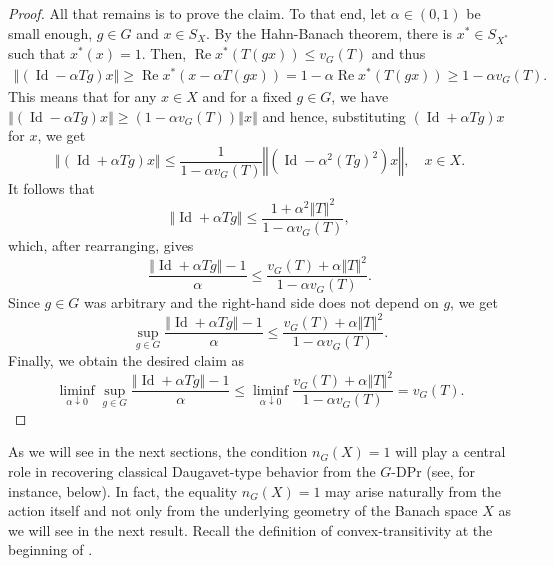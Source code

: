 \documentclass[a4paper,12pt]{amsart}
\theoremstyle{definition}
\theoremstyle{definition}
\theoremstyle{remark}
\numberwithin{equation}{section}
\DeclareMathOperator{\re}{Re}
\DeclareMathOperator{\id}{Id}
\newcommand{\<}{\langle}
\renewcommand{\>}{\rangle}
\newcommand{\norm}[1]{\left\Vert#1\right\Vert}
\begin{document}
\begin{proof}
		All that remains is to prove the claim. To that end, let $\alpha \in (0,1)$ be small enough, $g \in G$ and $x \in S_X$. By the Hahn-Banach theorem, there is $x^* \in S_{X^*}$ such that $x^*(x) = 1$. Then, $\re x^*(T(gx)) \le v_G(T)$ and thus
		\begin{align*}
			\norm{(\id - \alpha Tg)x}
			\ge \re x^*(x - \alpha T(gx))
			= 1 - \alpha \re x^*(T(gx))
			\ge 1 - \alpha v_G(T).
		\end{align*}
		This means that for any $x \in X$ and for a fixed $g \in G$, we have $\norm{(\id - \alpha Tg)x} \ge (1 - \alpha v_G(T))\norm{x}$ and hence, substituting $(\id + \alpha Tg)x$ for $x$, we get
		\begin{equation*}
			\norm{(\id +\alpha Tg)x} \le \frac{1}{1 - \alpha v_G(T)} \norm{(\id - \alpha^2 (Tg)^2)x}, \quad x \in X.
		\end{equation*}
		It follows that
		\begin{equation*}
			\norm{\id + \alpha Tg}
			\le \frac{1 + \alpha^2\norm{T}^2}{1 - \alpha v_G(T)},
		\end{equation*}
		which, after rearranging, gives
		\begin{equation*}
			\frac{\norm{\id + \alpha Tg} - 1}{\alpha}
			\le \frac{v_G(T) + \alpha \norm{T}^2}{1 - \alpha v_G(T)}.
		\end{equation*}
		Since $g \in G$ was arbitrary and the right-hand side does not depend on $g$, we get
		\begin{equation*}
			\sup_{g \in G} \frac{\norm{\id + \alpha Tg} - 1}{\alpha}
			\le \frac{v_G(T) + \alpha \norm{T}^2}{1 - \alpha v_G(T)}.
		\end{equation*}
		Finally, we obtain the desired claim as
		\begin{equation*}
			\liminf_{\alpha\downarrow 0} \sup_{g \in G} \frac{\norm{\id + \alpha Tg} - 1}{\alpha}
			\le \liminf_{\alpha\downarrow 0} \frac{v_G(T) + \alpha \norm{T}^2}{1 - \alpha v_G(T)}
			= v_G(T).
	\end{equation*}\end{proof} 
	
	
	As we will see in the next sections, the condition $n_G(X)=1$ will play a central role in recovering classical Daugavet-type behavior from the $G$-DPr (see, for instance,  below). In fact, the equality $n_G(X)=1$ may arise naturally from the action itself and not only from the underlying geometry of the Banach space $X$ as we will see in the next result. Recall the definition of convex-transitivity at the beginning of .
	
\end{document}
